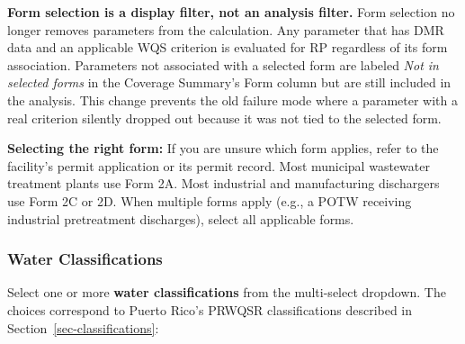 \documentclass[
  11pt,
  letterpaper,
  DIV=11,
  numbers=noendperiod]{scrartcl}
\begin{document}
\begin{tcolorbox}[enhanced jigsaw, arc=.35mm, bottomrule=.15mm, bottomtitle=1mm, breakable, colback=white, colbacktitle=quarto-callout-important-color!10!white, colframe=quarto-callout-important-color-frame, coltitle=black, left=2mm, leftrule=.75mm, opacityback=0, opacitybacktitle=0.6, rightrule=.15mm, title=\textcolor{quarto-callout-important-color}{\faExclamation}\hspace{0.5em}{Important}, titlerule=0mm, toprule=.15mm, toptitle=1mm]

\textbf{Form selection is a display filter, not an analysis filter.}
Form selection no longer removes parameters from the calculation. Any
parameter that has DMR data and an applicable WQS criterion is evaluated
for RP regardless of its form association. Parameters not associated
with a selected form are labeled \emph{Not in selected forms} in the
Coverage Summary's Form column but are still included in the analysis.
This change prevents the old failure mode where a parameter with a real
criterion silently dropped out because it was not tied to the selected
form.

\end{tcolorbox}

\begin{tcolorbox}[enhanced jigsaw, arc=.35mm, bottomrule=.15mm, bottomtitle=1mm, breakable, colback=white, colbacktitle=quarto-callout-tip-color!10!white, colframe=quarto-callout-tip-color-frame, coltitle=black, left=2mm, leftrule=.75mm, opacityback=0, opacitybacktitle=0.6, rightrule=.15mm, title=\textcolor{quarto-callout-tip-color}{\faLightbulb}\hspace{0.5em}{Tip}, titlerule=0mm, toprule=.15mm, toptitle=1mm]

\textbf{Selecting the right form:} If you are unsure which form applies,
refer to the facility's permit application or its permit record. Most
municipal wastewater treatment plants use Form 2A. Most industrial and
manufacturing dischargers use Form 2C or 2D. When multiple forms apply
(e.g., a POTW receiving industrial pretreatment discharges), select all
applicable forms.

\end{tcolorbox}

\subsubsection{Water Classifications}\label{sec-water-type-filter}

Select one or more \textbf{water classifications} from the multi-select
dropdown. The choices correspond to Puerto Rico's PRWQSR classifications
described in Section~\ref{sec-classifications}:
\end{document}
